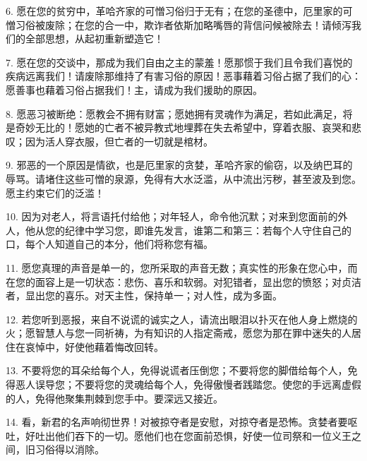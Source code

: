 6. 愿在您的贫穷中，革哈齐家的可憎习俗归于无有；在您的圣德中，厄里家的可憎习俗被废除；在您的合一中，欺诈者依斯加略嘴唇的背信问候被除去！请倾泻我们的全部思想，从起初重新塑造它！\par

7. 愿在您的交谈中，那成为我们自由之主的蒙羞！愿那惯于我们且令我们喜悦的疾病远离我们！请废除那维持了有害习俗的原因！恶事藉着习俗占据了我们的心：愿善事也藉着习俗占据我们！主，请成为我们援助的原因。\par

8. 愿恶习被断绝：愿教会不拥有财富；愿她拥有灵魂作为满足，若如此满足，将是奇妙无比的！愿她的亡者不被异教式地埋葬在失去希望中，穿着衣服、哀哭和悲叹；因为活人穿衣服，但亡者的一切就是棺材。\par

9. 邪恶的一个原因是情欲，也是厄里家的贪婪，革哈齐家的偷窃，以及纳巴耳的辱骂。请堵住这些可憎的泉源，免得有大水泛滥，从中流出污秽，甚至波及到您。愿主约束它们的泛滥！\par

10. 因为对老人，将言语托付给他；对年轻人，命令他沉默；对来到您面前的外人，他从您的纪律中学习您，即谁先发言，谁第二和第三：若每个人守住自己的口，每个人知道自己的本分，他们将称您有福。\par

11. 愿您真理的声音是单一的，您所采取的声音无数；真实性的形象在您心中，而在您的面容上是一切状态：悲伤、喜乐和软弱。对犯错者，显出您的愤怒；对贞洁者，显出您的喜乐。对天主性，保持单一；对人性，成为多面。\par

12. 若您听到恶报，来自不说谎的诚实之人，请流出眼泪以扑灭在他人身上燃烧的火；愿智慧人与您一同祈祷，为有知识的人指定斋戒，愿您为那在罪中迷失的人居住在哀悼中，好使他藉着悔改回转。\par

13. 不要将您的耳朵给每个人，免得说谎者压倒您；不要将您的脚借给每个人，免得恶人误导您；不要将您的灵魂给每个人，免得傲慢者践踏您。使您的手远离虚假的人，免得他聚集荆棘到您手中。要深远又接近。\par

14. 看，新君的名声响彻世界！对被掠夺者是安慰，对掠夺者是恐怖。贪婪者要呕吐，好吐出他们吞下的一切。愿他们也在您面前恐惧，好使一位司祭和一位义王之间，旧习俗得以消除。\par

